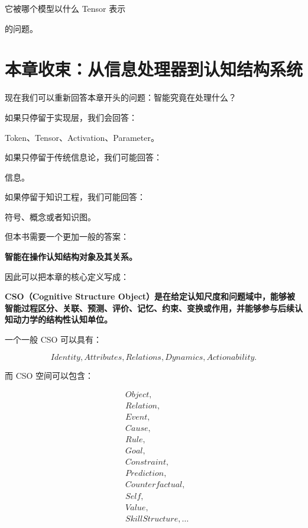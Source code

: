 \begin{statementbox}
它被哪个模型以什么 Tensor 表示
\end{statementbox}

的问题。


\section{本章收束：从信息处理器到认知结构系统}

现在我们可以重新回答本章开头的问题：智能究竟在处理什么？

如果只停留于实现层，我们会回答：

Token、Tensor、Activation、Parameter。

如果只停留于传统信息论，我们可能回答：

信息。

如果停留于知识工程，我们可能回答：

符号、概念或者知识图。

但本书需要一个更加一般的答案：

\begin{statementbox}
\bfseries
智能在操作认知结构对象及其关系。
\end{statementbox}

因此可以把本章的核心定义写成：

\begin{definition*}
\bfseries
CSO（Cognitive Structure Object）是在给定认知尺度和问题域中，能够被智能过程区分、关联、预测、评价、记忆、约束、变换或作用，并能够参与后续认知动力学的结构性认知单位。
\end{definition*}

一个一般 CSO 可以具有：

\[
Identity,
Attributes,
Relations,
Dynamics,
Actionability.
\]

而 CSO 空间可以包含：

\[
\begin{aligned}
&Object,\\
&Relation,\\
&Event,\\
&Cause,\\
&Rule,\\
&Goal,\\
&Constraint,\\
&Prediction,\\
&Counterfactual,\\
&Self,\\
&Value,\\
&SkillStructure,\ldots
\end{aligned}
\]

